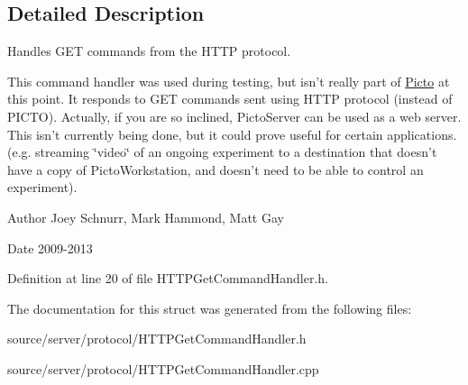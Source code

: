 \subsection{Detailed Description}
Handles G\-E\-T commands from the H\-T\-T\-P protocol. 

This command handler was used during testing, but isn't really part of \hyperlink{namespace_picto}{Picto} at this point. It responds to G\-E\-T commands sent using H\-T\-T\-P protocol (instead of P\-I\-C\-T\-O). Actually, if you are so inclined, Picto\-Server can be used as a web server. This isn't currently being done, but it could prove useful for certain applications. (e.\-g. streaming \char`\"{}video\char`\"{} of an ongoing experiment to a destination that doesn't have a copy of Picto\-Workstation, and doesn't need to be able to control an experiment). \begin{DoxyAuthor}{Author}
Joey Schnurr, Mark Hammond, Matt Gay 
\end{DoxyAuthor}
\begin{DoxyDate}{Date}
2009-\/2013 
\end{DoxyDate}


Definition at line 20 of file H\-T\-T\-P\-Get\-Command\-Handler.\-h.



The documentation for this struct was generated from the following files\-:\begin{DoxyCompactItemize}
\item 
source/server/protocol/H\-T\-T\-P\-Get\-Command\-Handler.\-h\item 
source/server/protocol/H\-T\-T\-P\-Get\-Command\-Handler.\-cpp\end{DoxyCompactItemize}
